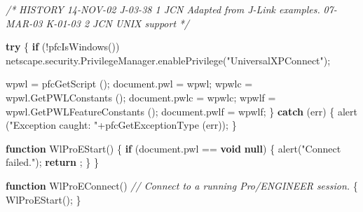 \documentclass[]{article}
\newenvironment{Shaded}{}{}
\newcommand{\KeywordTok}[1]{\textcolor[rgb]{0.00,0.44,0.13}{\textbf{{#1}}}}
\newcommand{\StringTok}[1]{\textcolor[rgb]{0.25,0.44,0.63}{{#1}}}
\newcommand{\CommentTok}[1]{\textcolor[rgb]{0.38,0.63,0.69}{\textit{{#1}}}}
\newcommand{\OtherTok}[1]{\textcolor[rgb]{0.00,0.44,0.13}{{#1}}}
\newcommand{\FunctionTok}[1]{\textcolor[rgb]{0.02,0.16,0.49}{{#1}}}
\newcommand{\NormalTok}[1]{{#1}}
\begin{document}
\begin{Shaded}
\begin{Highlighting}[]
\CommentTok{/*}
\CommentTok{   HISTORY}
\CommentTok{   }
\CommentTok{14-NOV-02   J-03-38   $$1   JCN      Adapted from J-Link examples.}
\CommentTok{07-MAR-03   K-01-03   $$2   JCN      UNIX support}
\CommentTok{ */}


\KeywordTok{try}
\NormalTok{\{}
  \KeywordTok{if} \NormalTok{(!}\FunctionTok{pfcIsWindows}\NormalTok{())}
    \OtherTok{netscape}\NormalTok{.}\OtherTok{security}\NormalTok{.}\OtherTok{PrivilegeManager}\NormalTok{.}\FunctionTok{enablePrivilege}\NormalTok{(}\StringTok{"UniversalXPConnect"}\NormalTok{);}
  
  \NormalTok{wpwl = }\FunctionTok{pfcGetScript} \NormalTok{();}
  \OtherTok{document}\NormalTok{.}\FunctionTok{pwl} \NormalTok{= wpwl;}
  \NormalTok{wpwlc = }\OtherTok{wpwl}\NormalTok{.}\FunctionTok{GetPWLConstants} \NormalTok{();}
  \OtherTok{document}\NormalTok{.}\FunctionTok{pwlc} \NormalTok{= wpwlc;}
  \NormalTok{wpwlf = }\OtherTok{wpwl}\NormalTok{.}\FunctionTok{GetPWLFeatureConstants} \NormalTok{();}
  \OtherTok{document}\NormalTok{.}\FunctionTok{pwlf} \NormalTok{= wpwlf;}
\NormalTok{\}}
\KeywordTok{catch} \NormalTok{(err)}
\NormalTok{\{}
  \FunctionTok{alert} \NormalTok{(}\StringTok{"Exception caught: "}\NormalTok{+}\FunctionTok{pfcGetExceptionType} \NormalTok{(err));}
\NormalTok{\}}

\KeywordTok{function} \FunctionTok{WlProEStart}\NormalTok{()}
\NormalTok{\{ }
  \KeywordTok{if} \NormalTok{(}\OtherTok{document}\NormalTok{.}\FunctionTok{pwl} \NormalTok{== }\KeywordTok{void} \KeywordTok{null}\NormalTok{)}
    \NormalTok{\{}
      \FunctionTok{alert}\NormalTok{(}\StringTok{"Connect failed."}\NormalTok{);}
      \KeywordTok{return} \NormalTok{;}
    \NormalTok{\}}
\NormalTok{\}}

\KeywordTok{function} \FunctionTok{WlProEConnect}\NormalTok{()}
\CommentTok{//  Connect to a running Pro/ENGINEER session.}
\NormalTok{\{}
  \FunctionTok{WlProEStart}\NormalTok{();}
\NormalTok{\}}


\end{Highlighting}
\end{Shaded}
\end{document}
